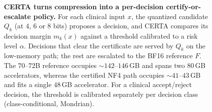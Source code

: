 \documentclass[pdflatex,sn-mathphys-num]{sn-jnl}%
\theoremstyle{thmstyleone}%
\theoremstyle{thmstyletwo}%
\theoremstyle{thmstylethree}%
\begin{document}
\begin{figure}[t]
{
}
\caption{\textbf{CERTA turns compression into a per-decision certify-or-escalate policy.}
For each clinical input $x$, the quantized candidate $Q_k$ (at $4$, $6$ or $8$ bits) proposes a
decision, and CERTA compares its decision margin $m_k(x)$ against a threshold calibrated to a risk
level $\alpha$. Decisions that clear the certificate are served by $Q_k$ on the low-memory path;
the rest are escalated to the BF16 reference $F$. The $70$--$72$B reference occupies
$\sim$$142$--$146$\,GB and spans two $80$\,GB accelerators, whereas the certified NF4 path occupies
$\sim$$41$--$43$\,GB and fits a single $48$\,GB accelerator. For a clinical accept/reject decision,
the threshold is calibrated separately per decision class (class-conditional, Mondrian).}
\label{fig:architecture}
\end{figure}
\end{document}
